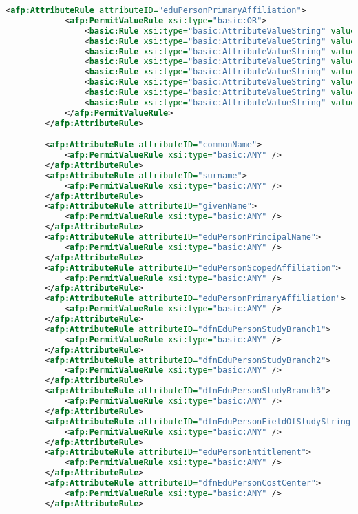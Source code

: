\begin{lstlisting}[language=xml]
        <afp:AttributeRule attributeID="eduPersonPrimaryAffiliation">
            <afp:PermitValueRule xsi:type="basic:OR">
                <basic:Rule xsi:type="basic:AttributeValueString" value="faculty" ignoreCase="true" />
                <basic:Rule xsi:type="basic:AttributeValueString" value="student" ignoreCase="true" />
                <basic:Rule xsi:type="basic:AttributeValueString" value="staff" ignoreCase="true" />
                <basic:Rule xsi:type="basic:AttributeValueString" value="alum" ignoreCase="true" />
                <basic:Rule xsi:type="basic:AttributeValueString" value="member" ignoreCase="true" />
                <basic:Rule xsi:type="basic:AttributeValueString" value="affiliate" ignoreCase="true" />
                <basic:Rule xsi:type="basic:AttributeValueString" value="employee" ignoreCase="true" />
                <basic:Rule xsi:type="basic:AttributeValueString" value="library-walk-in" ignoreCase="true" />
            </afp:PermitValueRule>
        </afp:AttributeRule>

        <afp:AttributeRule attributeID="commonName">
            <afp:PermitValueRule xsi:type="basic:ANY" />
        </afp:AttributeRule>
        <afp:AttributeRule attributeID="surname">
            <afp:PermitValueRule xsi:type="basic:ANY" />
        </afp:AttributeRule>
        <afp:AttributeRule attributeID="givenName">
            <afp:PermitValueRule xsi:type="basic:ANY" />
        </afp:AttributeRule>
        <afp:AttributeRule attributeID="eduPersonPrincipalName">
            <afp:PermitValueRule xsi:type="basic:ANY" />
        </afp:AttributeRule>
        <afp:AttributeRule attributeID="eduPersonScopedAffiliation">
            <afp:PermitValueRule xsi:type="basic:ANY" />
        </afp:AttributeRule>
        <afp:AttributeRule attributeID="eduPersonPrimaryAffiliation">
            <afp:PermitValueRule xsi:type="basic:ANY" />
        </afp:AttributeRule>
        <afp:AttributeRule attributeID="dfnEduPersonStudyBranch1">
            <afp:PermitValueRule xsi:type="basic:ANY" />
        </afp:AttributeRule>
        <afp:AttributeRule attributeID="dfnEduPersonStudyBranch2">
            <afp:PermitValueRule xsi:type="basic:ANY" />
        </afp:AttributeRule>
        <afp:AttributeRule attributeID="dfnEduPersonStudyBranch3">
            <afp:PermitValueRule xsi:type="basic:ANY" />
        </afp:AttributeRule>
        <afp:AttributeRule attributeID="dfnEduPersonFieldOfStudyString">
            <afp:PermitValueRule xsi:type="basic:ANY" />
        </afp:AttributeRule>
        <afp:AttributeRule attributeID="eduPersonEntitlement">
            <afp:PermitValueRule xsi:type="basic:ANY" />
        </afp:AttributeRule>
        <afp:AttributeRule attributeID="dfnEduPersonCostCenter">
            <afp:PermitValueRule xsi:type="basic:ANY" />
        </afp:AttributeRule>


\end{lstlisting}
